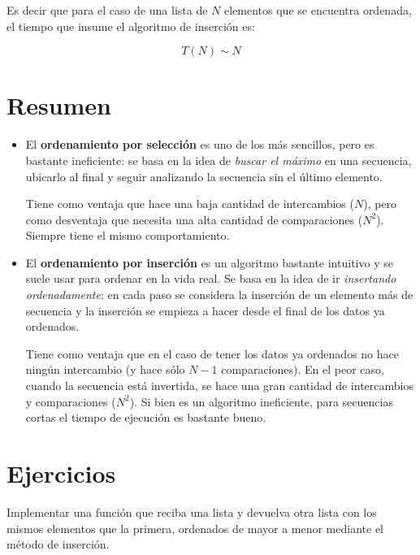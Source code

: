 Es decir que para el caso de una lista de $N$ elementos que se encuentra
ordenada, el tiempo que insume el algoritmo de inserción es:

\begin{equation}
T(N) \sim N
\end{equation}

\section{Resumen}

\begin{itemize}

\item El {\bf ordenamiento por selección} es uno de los más sencillos, pero es
bastante ineficiente: se basa en la idea de \emph{buscar el máximo} en una secuencia,
ubicarlo al final y seguir analizando la secuencia sin el último elemento.

Tiene como ventaja que hace una baja cantidad de intercambios ($N$), pero
como desventaja que necesita una alta cantidad de comparaciones ($N^2$).
Siempre tiene el mismo comportamiento.

\item El {\bf ordenamiento por inserción} es un algoritmo bastante intuitivo y se
suele usar para ordenar en la vida real. Se basa en la idea de ir \emph{insertando
ordenadamente}: en cada paso se considera la inserción de un elemento más de
secuencia y la inserción se empieza a hacer desde el final de los datos ya
ordenados.

Tiene como ventaja que en el caso de tener los datos ya ordenados no hace
ningún intercambio (y hace sólo $N-1$ comparaciones). En el peor caso, cuando
la secuencia está invertida, se hace una gran cantidad de intercambios y
comparaciones ($N^2$). Si bien es un algoritmo ineficiente, para secuencias
cortas el tiempo de ejecución es bastante bueno.

\end{itemize}

\newpage
\section{Ejercicios}

\begin{ejercicio}
Implementar una función que reciba una lista y devuelva otra lista con los
mismos elementos que la primera, ordenados de mayor a menor mediante el método
de inserción.
\end{ejercicio}
